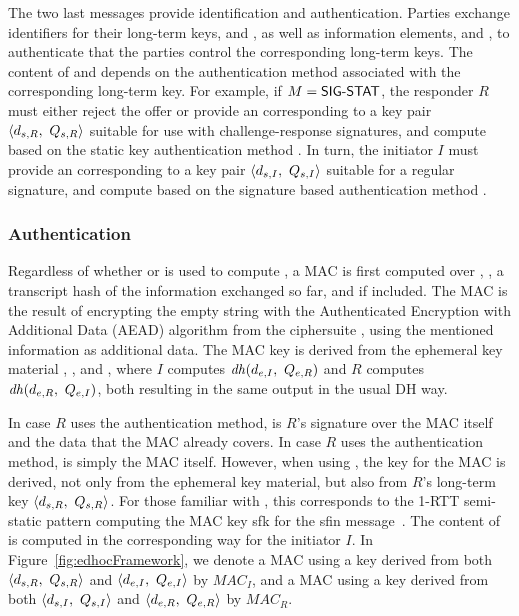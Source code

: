 The two last messages provide identification and authentication.
%
Parties exchange identifiers for their long-term keys, \mIdcredi{} and \mIdcredr{},
as well as information elements, \mAuthi{} and \mAuthr{}, to authenticate
that the parties control the corresponding long-term keys.
%
The content of \mAuthi{} and \mAuthr{} depends on the authentication method
associated with the corresponding long-term key.
%
For example, if $M{} = \textsf{SIG-STAT}{}$, the responder $R$ must either
reject the offer or provide an \mIdcredr{} corresponding to a key pair
$\langle\mPriv{R},\ \mPub{R}\rangle$ suitable for use with challenge-response
signatures, and
compute \mAuthr{} based on the static key authentication method \mStat{}.
%
In turn, the initiator $I$ must provide an \mIdcredi{} corresponding to a key
pair $\langle d_{s,I},\ Q_{s,I}\rangle$ suitable for a regular signature,
and compute
\mAuthi{} based on the signature based authentication method \mSig{}.
%

\subsubsection{Authentication}
Regardless of whether \mStat{} or \mSig{} is used to compute \mAuthr{}, a
MAC is first computed over \mIdcredr{}, \mCredr{}, a transcript hash of the
information exchanged so far, and \mADtwo{} if included.
%
The MAC is the result of encrypting the empty string with the Authenticated
Encryption with Additional Data (AEAD) algorithm from the ciphersuite
\mSuites{}, using the mentioned information as additional data.
%
The MAC key is derived from the ephemeral key material
\mGx{}, \mGy{}, \mX{} and \mY{}, where $I$
computes $\mathit{dh}(d_{e,I},\ Q_{e,R})$ and $R$ computes $\mathit{dh}(d_{e,R},\ Q_{e,I})$, both resulting in
the same output in the usual DH way.
%

In case $R$ uses the \mSig{} authentication method, \mAuthr{} is $R$'s
signature over the MAC itself and the data that the MAC already covers.
%
In case $R$ uses the \mStat{} authentication method, \mAuthr{} is simply the
MAC itself.
%
However, when using \mStat{}, the key for the MAC is derived, not only from the
ephemeral key material, but also from $R$'s long-term key
$\langle\mPriv{R},\ \mPub{R}\rangle$.
%
For those familiar with \mOptls, this corresponds to the 1-RTT semi-static
pattern computing the MAC key \textsf{sfk} for the \textsf{sfin}
message~\cite{DBLP:conf/eurosp/KrawczykW16}.
%
The content of \mAuthi{} is computed in the corresponding way for the initiator
$I$.
%
In Figure~\ref{fig:edhocFramework}, we denote a MAC using a key derived from
both $\langle\mPriv{R},\ \mPub{R}\rangle$ and $\langle d_{e,I},\ Q_{e,I}\rangle$ by
$\mathit{MAC}_I$, and a MAC using a key derived from
both $\langle d_{s,I},\ Q_{s,I}\rangle$ and $\langle d_{e,R},\ Q_{e,R}\rangle$ by
$\mathit{MAC}_R$.
%


